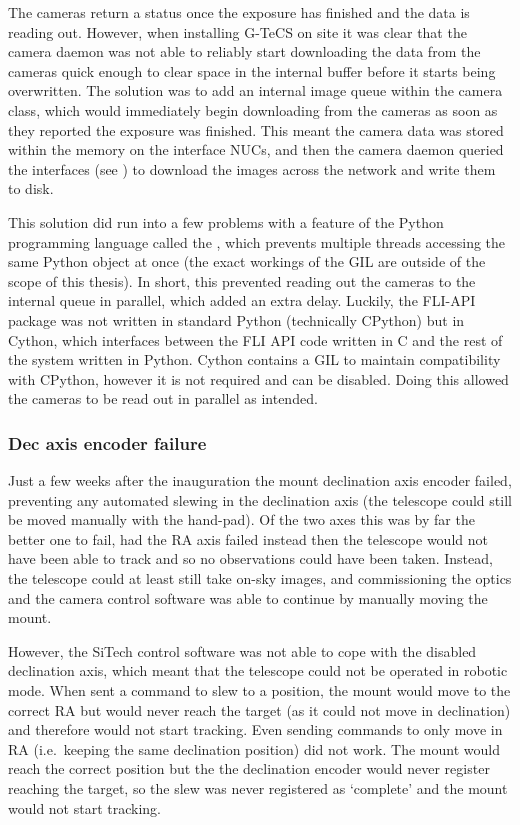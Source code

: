 \begin{colsection}
\begin{colsection}
The cameras return a  status once the exposure has finished and the data is reading out. However, when installing G-TeCS on site it was clear that the camera daemon was not able to reliably start downloading the data from the cameras quick enough to clear space in the internal buffer before it starts being overwritten. The solution was to add an internal image queue within the camera class, which would immediately begin downloading from the cameras as soon as they reported the exposure was finished. This meant the camera data was stored within the memory on the interface NUCs, and then the camera daemon queried the  interfaces (see ) to download the images across the network and write them to disk.

This solution did run into a few problems with a feature of the Python programming language called the , which prevents multiple threads accessing the same Python object at once (the exact workings of the GIL are outside of the scope of this thesis). In short, this prevented reading out the cameras to the internal queue in parallel, which added an extra delay. Luckily, the FLI-API package was not written in standard Python (technically CPython) but in Cython, which interfaces between the FLI API code written in C and the rest of the system written in Python. Cython contains a GIL to maintain compatibility with CPython, however it is not required and can be disabled. Doing this allowed the cameras to be read out in parallel as intended.

\subsubsection{Dec axis encoder failure}

Just a few weeks after the inauguration the mount declination axis encoder failed, preventing any automated slewing in the declination axis (the telescope could still be moved manually with the hand-pad). Of the two axes this was by far the better one to fail, had the RA axis failed instead then the telescope would not have been able to track and so no observations could have been taken. Instead, the telescope could at least still take on-sky images, and commissioning the optics and the camera control software was able to continue by manually moving the mount.

However, the SiTech control software was not able to cope with the disabled declination axis, which meant that the telescope could not be operated in robotic mode. When sent a command to slew to a position, the mount would move to the correct RA but would never reach the target (as it could not move in declination) and therefore would not start tracking. Even sending commands to only move in RA (i.e.\ keeping the same declination position) did not work. The mount would reach the correct position but the the declination encoder would never register reaching the target, so the slew was never registered as `complete' and the mount would not start tracking.


\end{colsection}
\end{colsection}
